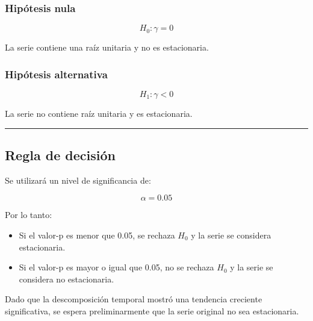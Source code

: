 \documentclass[11pt]{article}
\providecommand{\tightlist}{%
      \setlength{\itemsep}{0pt}\setlength{\parskip}{0pt}}
\begin{document}
\hypertarget{hipuxf3tesis-nula}{%
\subsubsection{Hipótesis nula}\label{hipuxf3tesis-nula}}

\[
H_0:\gamma = 0
\]

La serie contiene una raíz unitaria y no es estacionaria.

\hypertarget{hipuxf3tesis-alternativa}{%
\subsubsection{Hipótesis alternativa}\label{hipuxf3tesis-alternativa}}

\[
H_1:\gamma < 0
\]

La serie no contiene raíz unitaria y es estacionaria.

\begin{center}\rule{0.5\linewidth}{0.5pt}\end{center}

\hypertarget{regla-de-decisiuxf3n}{%
\subsection{Regla de decisión}\label{regla-de-decisiuxf3n}}

Se utilizará un nivel de significancia de:

\[
\alpha = 0.05
\]

Por lo tanto:

\begin{itemize}
\tightlist
\item
  Si el valor-p es menor que 0.05, se rechaza \(H_0\) y la serie se
  considera estacionaria.
\item
  Si el valor-p es mayor o igual que 0.05, no se rechaza \(H_0\) y la
  serie se considera no estacionaria.
\end{itemize}

Dado que la descomposición temporal mostró una tendencia creciente
significativa, se espera preliminarmente que la serie original no sea
estacionaria.
\end{document}
